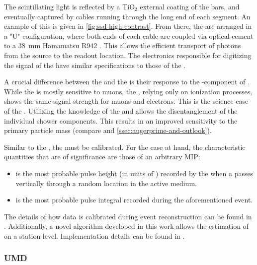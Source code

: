 The scintillating light is reflected by a TiO$_2$ external coating of the bars,
and eventually captured by \WLS cables running through the long end of each 
segment. An example of this is given in \cref{fig:ssd-high-contrast}. From 
there, the \WLSs are arranged in a "U" configuration, where both ends of each 
cable are coupled via optical cement to a \SI{38}{\milli\meter} Hamamatsu R942 
\PMT \cite{hamamatsuphotonicsPhotomultiplierTubeR9420}. This allows the 
efficient transport of photons from the source to the readout location. The
electronics responsible for digitizing the signal of the \SSD \PMT have similar 
specifications to those of the \WCD 
\cite{collaborationPierreAugerObservatory2016}.

A crucial difference between the \WCD and the \SSD is their response to the 
\EM-component of \EASs. While the \WCD is mostly sensitive to muons, the \SSD,
relying only on ionization processes, shows the same signal strength for muons
and electrons. This is the science case of the \SSD. Utilizing the knowledge of
the \WCD and \SSD allows the disentanglement of the individual shower 
components. This results in an improved sensitivity to the primary particle
mass (compare  and \cref{ssec:augerprime-and-outlook}).

Similar to the \WCD, the \SSD must be calibrated. For the case at hand, the 
characteristic quantities that are of significance are those of an arbitrary 
\acf{MIP}:

\begin{itemize}
	\item \Imip is the most probable pulse height (in units of \ADC) 
	recorded by the \SSD \PMT when a \MIP passes vertically through a 
	random location in the \SSD active medium.
	\item \Qmip is the most probable pulse integral recorded during the 
	aforementioned event.
\end{itemize}

The details of how \SSD data is calibrated during event reconstruction can be
found in . Additionally, a novel algorithm developed in this work
allows the estimation of \Imip on a station-level. Implementation details can be
found in .

\subsubsection{\acf{UMD}}

